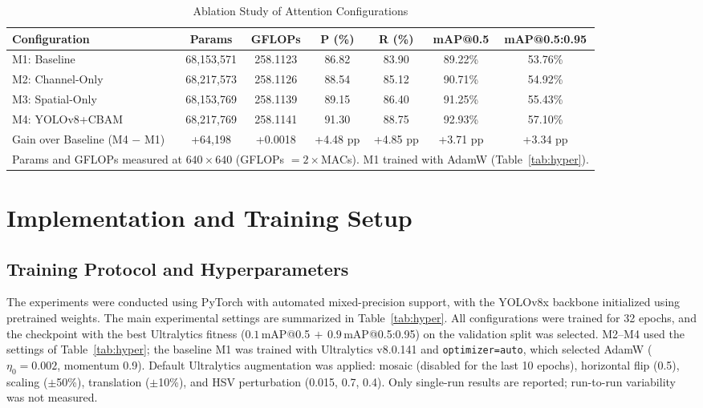 \documentclass[conference]{IEEEtran}
\begin{document}
\begin{table}[!t]
\caption{Ablation Study of Attention Configurations}
\label{tab:ablation}
\centering
\renewcommand{\arraystretch}{1.1}
\begin{tabular}{|l|c|c|c|c|c|c|}
\hline
\textbf{Configuration} & \textbf{Params} & \textbf{GFLOPs} & \textbf{P (\%)} & \textbf{R (\%)} & \textbf{mAP@0.5} & \textbf{mAP@0.5:0.95} \\
\hline
M1: Baseline     & 68,153,571 & 258.1123 & 86.82 & 83.90 & 89.22\% & 53.76\% \\
M2: Channel-Only & 68,217,573 & 258.1126 & 88.54 & 85.12 & 90.71\% & 54.92\% \\
M3: Spatial-Only & 68,153,769 & 258.1139 & 89.15 & 86.40 & 91.25\% & 55.43\% \\
M4: YOLOv8+CBAM  & 68,217,769 & 258.1141 & 91.30 & 88.75 & 92.93\% & 57.10\% \\
\hline
Gain over Baseline (M4 $-$ M1) & +64,198 & +0.0018 & +4.48 pp & +4.85 pp & +3.71 pp & +3.34 pp \\
\hline
\multicolumn{7}{l}{\footnotesize Params and GFLOPs measured at $640\times640$ (GFLOPs $=2\times$MACs). M1 trained with AdamW (Table~\ref{tab:hyper}).}\\
\end{tabular}
\end{table}

\section{Implementation and Training Setup}

\subsection{Training Protocol and Hyperparameters}

The experiments were conducted using PyTorch with automated mixed-precision support, with the YOLOv8x backbone initialized using pretrained weights. The main experimental settings are summarized in Table~\ref{tab:hyper}. All configurations were trained for 32 epochs, and the checkpoint with the best Ultralytics fitness ($0.1\,$mAP@0.5$\,+\,0.9\,$mAP@0.5:0.95) on the validation split was selected. M2--M4 used the settings of Table~\ref{tab:hyper}; the baseline M1 was trained with Ultralytics v8.0.141 and \texttt{optimizer=auto}, which selected AdamW ($\eta_0=0.002$, momentum 0.9). Default Ultralytics augmentation was applied: mosaic (disabled for the last 10 epochs), horizontal flip (0.5), scaling ($\pm$50\%), translation ($\pm$10\%), and HSV perturbation (0.015, 0.7, 0.4). Only single-run results are reported; run-to-run variability was not measured.
\end{document}
